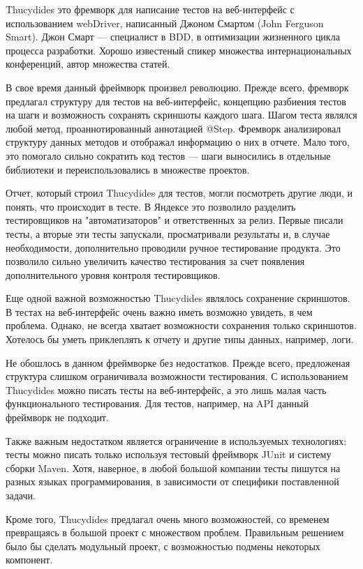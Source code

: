 Thucydides это фремворк для написание тестов на веб-интерфейс с использованием webDriver, написанный Джоном Смартом (John Ferguson Smart). Джон Смарт --- специалист в BDD, в оптимизации жизненного цикла процесса разработки. Хорошо известеный спикер множества интернациональных конференций, автор множества статей.

В свое время данный фреймворк произвел революцию. Прежде всего, фремворк предлагал структуру для тестов на веб-интерфейс, концепцию разбиения тестов на шаги и возможность сохранять скриншоты каждого шага. Шагом теста являлся любой метод, проаннотированный аннотацией @Step.
Фремворк анализировал структуру данных методов и отображал информацию о них в отчете. Мало того, это помогало сильно сократить код тестов --- шаги выносились в отдельные библиотеки и переиспользовались в множестве проектов.

Отчет, который строил Thucydides для тестов, могли посмотреть другие люди, и понять, что происходит в тесте. В Яндексе это позволило разделить тестировщиков на "автоматизаторов" и ответственных за релиз. Первые писали тесты, а вторые эти тесты запускали, просматривали результаты и, в случае необходимости, дополнительно проводили ручное тестирование продукта. Это позволило сильно увеличить качество тестирования за счет появления дополнительного уровня контроля тестировщиков.

Еще одной важной возможностью Thucydides являлось сохранение скриншотов. В тестах на веб-интерфейс очень важно иметь возможно увидеть, в чем проблема. Однако, не всегда хватает возможности сохранения только скриншотов. Хотелось бы уметь приклеплять к отчету и другие типы данных, например, логи.

Не обошлось в данном фреймворке без недостатков. Прежде всего, предложеная структура слишком ограничивала возможности тестирования. С использованием Thucydides можно писать тесты на веб-интерфейс, а это лишь малая часть функционального тестирования. Для тестов, например, на API данный фреймворк не подходит.

Также важным недостатком является ограничение в используемых технологиях: тесты можно писать только используя тестовый фреймворк JUnit и систему сборки Maven. Хотя, наверное, в любой большой компании тесты пишутся на разных языках программирования, в зависимости от специфики поставленной задачи.  

Кроме того, Thucydides предлагал очень много возможностей, со временем превращаясь в большой проект с множеством проблем. Правильным решением было бы сделать модульный проект, с возможностью подмены некоторых компонент.

